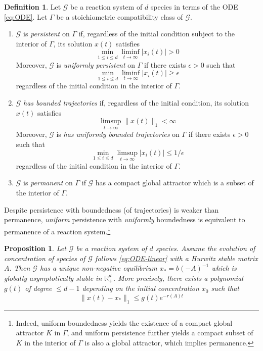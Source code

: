 \documentclass[10pt]{amsart}
\numberwithin{equation}{section}
\theoremstyle{plain}
\newtheorem{proposition}[theorem]{Proposition}
\theoremstyle{definition}
\newtheorem{definition}[theorem]{Definition}
\theoremstyle{remark}
\newcommand{\cG}{\mathcal{G}}
\begin{document}
\begin{definition}\label{def:persistence+boundedness+permanence}
Let $\cG$ be a reaction system of $d$ species in terms of the ODE \eqref{eq:ODE}. {Let $\Gamma$ be a stoichiometric compatibility class of $\cG$.}
\begin{enumerate}
\item[$\bullet$] $\cG$ is \emph{persistent} on $\Gamma$  if, regardless of the initial condition subject to the interior of $\Gamma$, its solution $x(t)$ satisfies
\[\min_{1\le i\le d}\liminf_{t\to\infty}|x_i(t)|>0\] 
{Moreover, $\cG$ is \emph{uniformly persistent} on $\Gamma$ if there exists $\epsilon>0$ such that 
\[\min_{1\le i\le d}\liminf_{t\to\infty}|x_i(t)|\ge \epsilon\]
regardless of the initial condition in the interior of $\Gamma$.}
\item[$\bullet$] $\cG$ \emph{has bounded trajectories}  if, regardless of the initial condition, its solution $x(t)$ satisfies
\[\limsup_{t\to\infty}\|x(t)\|_1<\infty\]
{Moreover, $\cG$ is \emph{has uniformly bounded trajectories} on $\Gamma$ if there exists $\epsilon>0$ such that 
\[\min_{1\le i\le d}\limsup_{t\to\infty}|x_i(t)|\le 1/\epsilon\]
regardless of the initial condition in the interior of $\Gamma$.}
\item[$\bullet$] {$\cG$ is \emph{permanent} on $\Gamma$ if $\cG$ has a compact global attractor which is a subset of the interior of $\Gamma$.}
\end{enumerate}
\end{definition}
Despite persistence with boundedness (of trajectories) is weaker than permanence,  \emph{uniform} persistence with  \emph{uniformly} boundedness is equivalent to permanence of a reaction system.\footnote{Indeed, uniform boundedness yields the existence of a compact global attractor $K$ in $\Gamma$, and uniform persistence further yields a compact subset of $K$ in the interior of $\Gamma$ is also a global attractor, which implies permanence.}

\begin{proposition}\label{thm:linear-ode}
Let $\cG$ be a reaction system of $d$ species. Assume the evolution of concentration of species of $\cG$ %
follows \eqref{eq:ODE-linear} with a Hurwitz stable matrix $A$.
Then $\cG$ has a unique non-negative equilibrium $x_*=b(-A)^{-1}$ which is globally asymptotically stable in $\mathbb{R}^d_+$. More precisely, there exists a polynomial $g(t)$ of degree $\le d-1$  depending on the initial concentration $x_0$ such that
\begin{equation}\label{eq:sharp-exponential}
\|x(t)-x_*\|_1\le g(t)e^{-r(A) t}
\end{equation}
\end{proposition}
\end{document}
